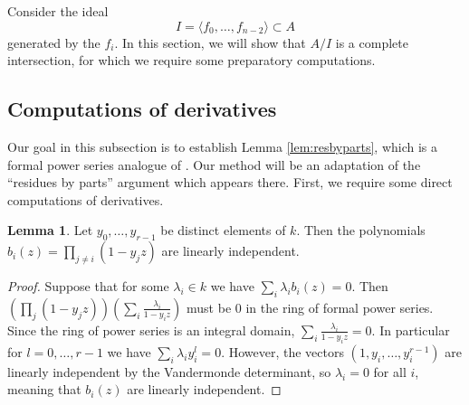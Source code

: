 \documentclass{amsart}
\numberwithin{equation}{section}
\theoremstyle{definition}
\newtheorem{lemma}[theorem]{Lemma}
\begin{document}
Consider the ideal
\[
I = \langle f_0, \ldots, f_{n - 2} \rangle \subset A
\]
generated by the $f_i$.  In this section, we will show that $A/I$ is a complete intersection, for which we require some preparatory computations.

\subsection{Computations of derivatives}

Our goal in this subsection is to establish Lemma \ref{lem:resbyparts}, which is a formal power series analogue of \cite[Lemma 3.4]{CE}.  Our method will be an adaptation of the ``residues by parts'' argument which appears there.  First, we require some direct computations of derivatives.

\begin{lemma}\label{lem:vand}Let $y_0, \ldots, y_{r - 1}$ be distinct elements of $k$.  Then the polynomials $b_i(z) = \prod_{j \neq i} (1 - y_j z)$ are linearly independent.
\end{lemma}
\begin{proof} 
Suppose that for some $\lambda_i \in k$ we have $\sum_i \lambda_ib_i(z)=0$.  Then $\left(\prod_j (1-y_jz)\right)\left(\sum_i \frac{\lambda_i}{1-y_iz}\right)$ must be $0$ in the ring of formal power series. Since the ring of power series is an integral domain, $\sum_i \frac{\lambda_i}{1-y_iz}=0$. In particular for $l=0,\dots,r-1$ we have $\sum_i \lambda_iy_i^l=0$.  However, the vectors $(1,y_i,\dots,y_i^{r-1})$ are linearly independent by the Vandermonde determinant, so $\lambda_i=0$ for all $i$, meaning that $b_i(z)$ are linearly independent.
\end{proof}
\end{document}

